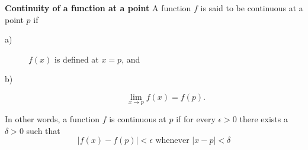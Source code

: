 \begin{mydef} \textbf{Continuity of a function at a point} 
A function  $f$ is said to be continuous at a point  $p$ if
\begin{description}
\item[a)]  $f(x)$ is defined at  $x=p$, and
\item[b)]
\[
\lim_{x\rightarrow p} f(x)=f(p).
\]
\end{description}
In other words, a function  $f$ is continuous at  $p$ if for every  $\epsilon >0$ there exists a  $\delta >0$ such that
\[
|f(x) - f(p)| < \epsilon \textrm{ whenever } |x - p| < \delta
\]
\end{mydef}
